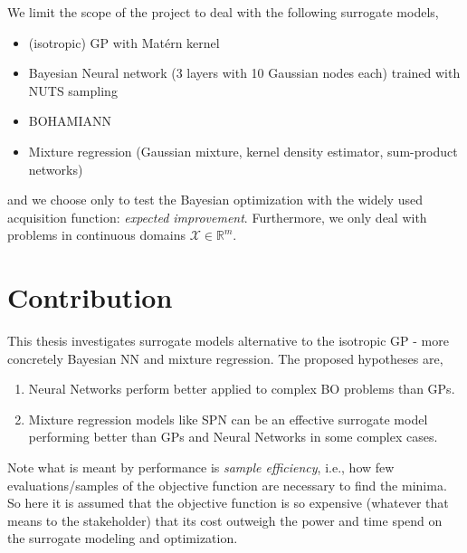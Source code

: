 We limit the scope of the project to deal with the following surrogate models, 
\begin{itemize}[noitemsep]
    \item (isotropic) GP with Matérn kernel
    \item Bayesian Neural network (3 layers with 10 Gaussian nodes each) trained with NUTS sampling
    \item BOHAMIANN
    \item Mixture regression (Gaussian mixture, kernel density estimator, sum-product networks)
\end{itemize}
and we choose only to test the Bayesian optimization with the widely used acquisition function:
\textit{expected improvement}. Furthermore, we only deal with problems in continuous domains
$\mathcal{X} \in \mathbb{R}^m$.


\section{Contribution}
This thesis investigates surrogate models alternative to the isotropic GP - more concretely Bayesian NN
and mixture regression. The proposed hypotheses are,
\begin{enumerate}
    \item Neural Networks perform better applied to complex BO problems than GPs.
    \item Mixture regression models like SPN can be an effective surrogate model
    performing better than GPs and Neural Networks in some complex cases. 
\end{enumerate}

Note what is meant by performance is \textit{sample efficiency}, i.e., how few evaluations/samples
of the objective function are necessary to find the minima. So here it is assumed that the objective
function is so expensive (whatever that means to the stakeholder) that its cost outweigh the power
and time spend on the surrogate modeling and optimization.


    


